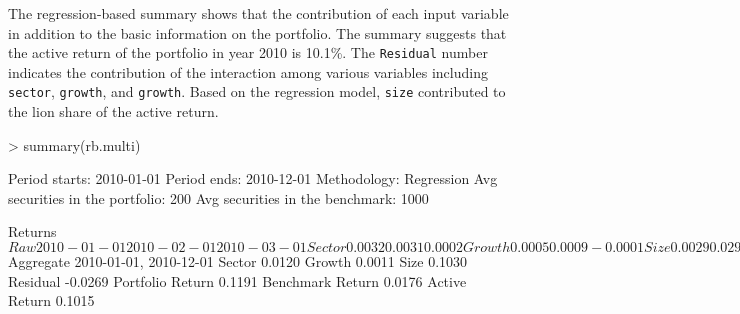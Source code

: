 The regression-based summary shows that the contribution of each input
variable in addition to the basic information on the portfolio. The
summary suggests that the active return of the portfolio in year 2010
is 10.1\%. The \texttt{Residual} number indicates the contribution
of the interaction among various variables including \texttt{sector},
\texttt{growth}, and \texttt{growth}. Based on the
regression model, \texttt{size} contributed to the lion share of the
active return.

\begin{Schunk}
\begin{Sinput}
> summary(rb.multi)
\end{Sinput}
\begin{Soutput}
Period starts:                       2010-01-01
Period ends:                         2010-12-01
Methodology:                         Regression
Avg securities in the portfolio:     200
Avg securities in the benchmark:     1000

Returns 
$Raw
                 2010-01-01 2010-02-01 2010-03-01
Sector               0.0032     0.0031     0.0002
Growth               0.0005     0.0009    -0.0001
Size                 0.0029     0.0295     0.0105
Residual             0.0081    -0.0172    -0.0302
Portfolio Return    -0.0291     0.0192     0.0298
Benchmark Return    -0.0438     0.0029     0.0494
Active Return        0.0147     0.0163    -0.0196
                 2010-04-01 2010-05-01 2010-06-01
Sector               0.0016     0.0039     0.0070
Growth               0.0001     0.0002     0.0004
Size                 0.0135     0.0037     0.0018
Residual            -0.0040     0.0310     0.0183
Portfolio Return    -0.0080    -0.0381     0.0010
Benchmark Return    -0.0192    -0.0769    -0.0266
Active Return        0.0113     0.0388     0.0276
                 2010-07-01 2010-08-01 2010-09-01
Sector               0.0016     0.0047    -0.0022
Growth              -0.0005     0.0005    -0.0006
Size                 0.0064     0.0000     0.0096
Residual            -0.0324     0.0173    -0.0220
Portfolio Return     0.0515    -0.0119     0.0393
Benchmark Return     0.0764    -0.0344     0.0545
Active Return       -0.0249     0.0225    -0.0152
                 2010-10-01 2010-11-01 2010-12-01
Sector               0.0015    -0.0044    -0.0082
Growth              -0.0010    -0.0004     0.0010
Size                 0.0022     0.0130     0.0056
Residual             0.0137     0.0175    -0.0247
Portfolio Return     0.0414    -0.0036     0.0260
Benchmark Return     0.0249    -0.0293     0.0523
Active Return        0.0165     0.0257    -0.0263

$Aggregate
                 2010-01-01, 2010-12-01
Sector                           0.0120
Growth                           0.0011
Size                             0.1030
Residual                        -0.0269
Portfolio Return                 0.1191
Benchmark Return                 0.0176
Active Return                    0.1015
\end{Soutput}
\end{Schunk}

